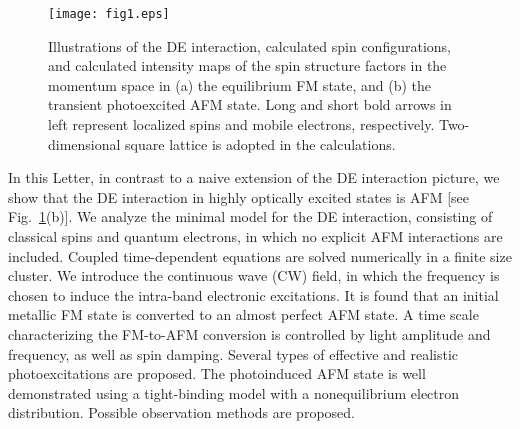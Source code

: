 \documentclass[aps,twocolumn,showpacs,prl,amsmath,amssymb]{revtex4-1}
\begin{document}
\begin{figure}[t]
\begin{center}
\texttt{[image: fig1.eps]}
\end{center}
\caption{
Illustrations of the DE interaction, calculated spin configurations, and calculated intensity maps of the spin structure factors in the momentum space in (a) the equilibrium FM state, and (b) the transient photoexcited AFM state. 
Long and short bold arrows in left represent localized spins and mobile electrons, respectively. 
Two-dimensional square lattice is adopted in the calculations.
}
\label{fig:fig1}
\end{figure}
%
In this Letter, in contrast to a naive extension of the DE interaction picture, we show that the DE interaction in highly optically excited states is AFM [see Fig.~\ref{fig:fig1}(b)].
We analyze the minimal model for the DE interaction, consisting of classical spins and quantum electrons, in which no explicit AFM interactions are included. 
Coupled time-dependent equations are solved numerically in a finite size cluster. 
We introduce the continuous wave (CW) field, in which the frequency is chosen to induce the intra-band electronic excitations.
It is found that an initial metallic FM state is converted to an almost perfect AFM state. 
A time scale characterizing the FM-to-AFM conversion is controlled by light amplitude and frequency, as well as spin damping. 
Several types of effective and realistic photoexcitations are proposed.
The photoinduced AFM state is well demonstrated using a tight-binding model with a nonequilibrium electron distribution. 
Possible observation methods are proposed. 
\end{document}
